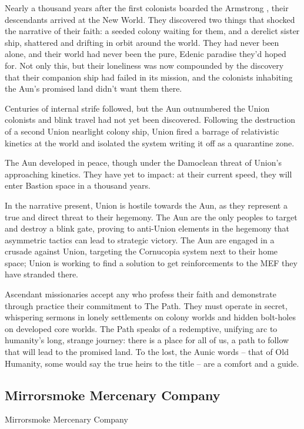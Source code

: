 Nearly a thousand years after the first colonists boarded the Armstrong , their descendants  
arrived at the New World. They discovered two things that shocked the narrative of their faith: a  
seeded colony waiting for them, and a derelict sister ship, shattered and drifting in orbit around  
the world. They had never been alone, and their world had never been the pure, Edenic paradise  
they’d hoped for. Not only this, but their loneliness was now compounded by the discovery that  
their companion ship had failed in its mission, and the colonists inhabiting the Aun’s promised  
land didn’t want them there. 
 

Centuries of internal strife followed, but the Aun outnumbered the Union colonists and blink  
travel had not yet been discovered. Following the destruction of a second Union nearlight colony  
ship, Union fired a barrage of relativistic kinetics at the world and isolated the system writing it  
off as a quarantine zone.
 

The Aun developed in peace, though under the Damoclean threat of Union’s approaching  
kinetics. They have yet to impact: at their current speed, they will enter Bastion space in a  
thousand years. 
 

In the narrative present, Union is hostile towards the Aun, as they represent a true and direct  
threat to their hegemony. The Aun are the only peoples to target and destroy a blink gate,  
proving to anti-Union elements in the hegemony that asymmetric tactics can lead to strategic  
victory. The Aun are engaged in a crusade against Union, targeting the Cornucopia system next  
to their home space; Union is working to find a solution to get reinforcements to the MEF they  
have stranded there. 
 

Ascendant missionaries accept any who profess their faith and demonstrate through practice  
their commitment to The Path. They must operate in secret, whispering sermons in lonely  
settlements on colony worlds and hidden bolt-holes on developed core worlds. The Path speaks  
of a redemptive, unifying arc to humanity’s long, strange journey: there is a place for all of us, a  
path to follow that will lead to the promised land. To the lost, the Aunic words -- that of Old  
Humanity, some would say the true heirs to the title -- are a comfort and a guide.
 
\subsection{Mirrorsmoke Mercenary Company}
Mirrorsmoke Mercenary Company  

